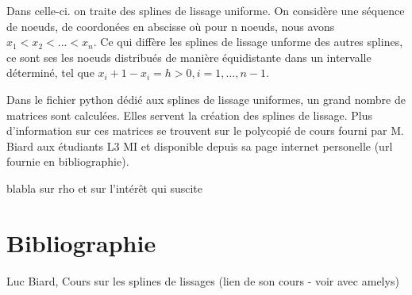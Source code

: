 \documentclass[a4paper,12pt]{article} %
\begin{document}
Dans celle-ci. on traite des splines de lissage uniforme.
On considère une séquence de noeuds,  de coordonées en abscisse où pour n noeuds, nous avons $x_1 < x_2 < ... < x_n$. Ce qui diffère les splines de lissage unforme des autres splines, ce sont ses les noeuds distribués de manière équidistante dans un intervalle déterminé, tel que $x_i+1 - x_i = h > 0, i = 1,...,n-1$.

Dans le fichier python dédié aux splines de lissage uniformes, un grand nombre de matrices sont calculées. Elles servent la création des splines de lissage. Plus d'information sur ces matrices se trouvent sur le polycopié de cours fourni par M. Biard aux étudiants L3 MI et disponible depuis sa page internet personelle (url fournie en bibliographie).

blabla sur rho et sur l'intérêt qui suscite
\section{Bibliographie}
Luc Biard, Cours sur les splines de lissages
(lien de son cours - voir avec amelys)
\end{document}
